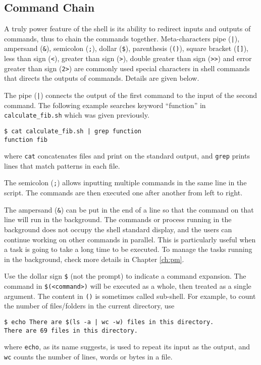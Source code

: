 \subsection{Command Chain}

A truly power feature of the shell is its ability to redirect inputs and outputs of commands, thus to chain the commands together. Meta-characters pipe (\verb?|?), ampersand (\verb|&|), semicolon (\verb|;|), dollar (\verb|$|), parenthesis (\verb|()|), square bracket (\verb|[]|), less than sign (\verb|<|), greater than sign (\verb|>|), double greater than sign (\verb|>>|) and error greater than sign (\verb|2>|) are commonly used special characters in shell commands that directs the outputs of commands. Details are given below.

The pipe (\verb$|$) connects the output of the first command to the input of the second command. The following example searches keyword ``function'' in \verb|calculate_fib.sh| which was given previously.
\begin{lstlisting}
$ cat calculate_fib.sh | grep function
function fib
\end{lstlisting}
where \verb|cat| concatenates files and print on the standard output, and \verb|grep| prints lines that match patterns in each file.

The semicolon (\verb|;|) allows inputting multiple commands in the same line in the script. The commands are then executed one after another from left to right.

The ampersand (\verb|&|) can be put in the end of a line so that the command on that line will run in the background. The commands or process running in the background does not occupy the shell standard display, and the users can continue working on other commands in parallel. This is particularly useful when a task is going to take a long time to be executed. To manage the tasks running in the background, check more details in Chapter \ref{ch:pm}.

Use the dollar sign \verb|$| (not the prompt) to indicate a command expansion. The command in \verb|$(<command>)| will be executed as a whole, then treated as a single argument. The content in \verb|()| is sometimes called sub-shell. For example, to count the number of files/folders in the current directory, use
\begin{lstlisting}
$ echo There are $(ls -a | wc -w) files in this directory.
There are 69 files in this directory.
\end{lstlisting}
where \verb|echo|, as its name suggests, is used to repeat its input as the output, and \verb|wc| counts the number of lines, words or bytes in a file.

